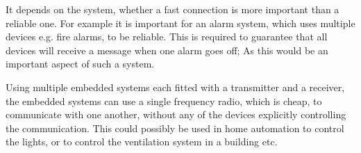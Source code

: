 It depends on the system, whether a fast connection is more important than a reliable one.
For example it is important for an alarm system, which uses multiple devices e.g. fire alarms, to be reliable.
This is required to guarantee that all devices will receive a message when one alarm goes off;
As this would be an important aspect of such a system.


\bigskip

Using multiple embedded systems each fitted with a transmitter and a receiver, the embedded systems can use a single frequency radio, which is cheap, to communicate with one another, without any of the devices explicitly controlling the communication.
This could possibly be used in home automation to control the lights, or to control the ventilation system in a building etc.
